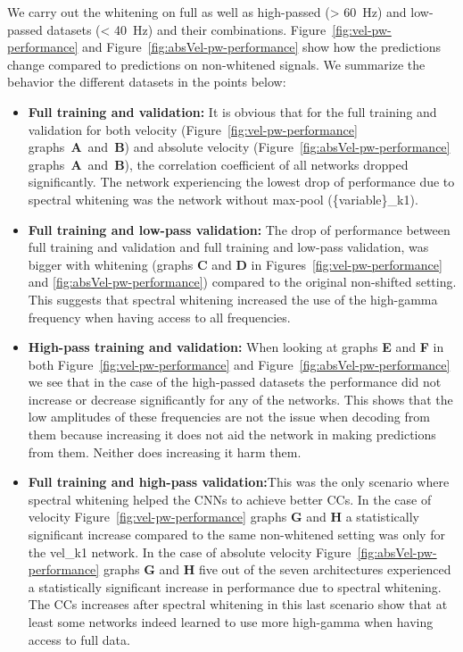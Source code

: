 We carry out the whitening on full as well as high-passed (> 60~Hz) and low-passed datasets (< 40~Hz) and their combinations. 
Figure~\ref{fig:vel-pw-performance} and Figure~\ref{fig:absVel-pw-performance} show how the predictions change compared to predictions on non-whitened signals.
We summarize the behavior the different datasets in the points below:
\begin{itemize}
    \item \textbf{Full training and validation:} It is obvious that for the full training and validation for both velocity (Figure~\ref{fig:vel-pw-performance} graphs~\textbf{A}~and~\textbf{B}) and absolute velocity (Figure~\ref{fig:absVel-pw-performance} graphs~\textbf{A}~and~\textbf{B}), the correlation coefficient of all networks dropped significantly. The network experiencing the lowest drop of performance due to spectral whitening was the network without max-pool (\{variable\}\_k1).

    \item \textbf{Full training and low-pass validation:} The drop of performance between full training and validation and full training and low-pass validation, was bigger with whitening (graphs \textbf{C} and \textbf{D} in Figures~\ref{fig:vel-pw-performance} and \ref{fig:absVel-pw-performance}) compared to the original non-shifted setting. This suggests that spectral whitening increased the use of the high-gamma frequency when having access to all frequencies.  
    
    \item \textbf{High-pass training and validation:} When looking at graphs \textbf{E} and \textbf{F} in both Figure~\ref{fig:vel-pw-performance} and Figure~\ref{fig:absVel-pw-performance} we see that in the case of the high-passed datasets the performance did not increase or decrease significantly for any of the networks. 
    This shows that the low amplitudes of these frequencies are not the issue when decoding from them because increasing it does not aid the network in making predictions from them. Neither does increasing it harm them.
    
    \item \textbf{Full training and high-pass validation:}This was the only scenario where spectral whitening helped the CNNs to achieve better CCs. 
    In the case of velocity Figure~\ref{fig:vel-pw-performance} graphs \textbf{G} and \textbf{H} a statistically significant increase compared to the same non-whitened setting was only for the vel\_k1 network.
    In the case of absolute velocity Figure~\ref{fig:absVel-pw-performance} graphs \textbf{G} and \textbf{H} five out of the seven architectures experienced a statistically significant increase in performance due to spectral whitening.
    The CCs increases after spectral whitening in this last scenario show that at least some networks indeed learned to use more high-gamma when having access to full data.
\end{itemize}


